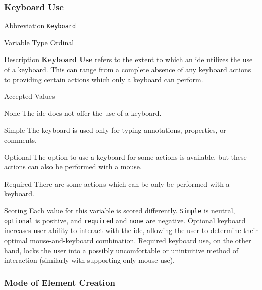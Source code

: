 \subsubsection{Keyboard Use}
\label{subsubsec:keyboard}

\begin{AlignedDesc}
  \item[Abbreviation] \texttt{Keyboard}

  \item[Variable Type] Ordinal

  \item[Description] \textbf{Keyboard Use} refers to the extent to which an
  \ac{ide} utilizes the use of a keyboard. This can range from a complete
  absence of any keyboard actions to providing certain actions which only a
  keyboard can perform.

  \item[Accepted Values]

  \begin{AlignedDesc}
    \item[None] The \ac{ide} does not offer the use of a keyboard.
    \item[Simple] The keyboard is used only for typing annotations,
      properties, or comments.
    \item[Optional] The option to use a keyboard for some actions is
    available, but these actions can also be performed with a mouse.
    \item[Required] There are some actions which can be only be performed
    with a keyboard.
  \end{AlignedDesc}

  \item[Scoring] Each value for this variable is scored differently.
  \texttt{Simple} is neutral, \texttt{optional} is positive, and
  \texttt{required} and \texttt{none} are negative. Optional keyboard
  increases user ability to interact with the \ac{ide}, allowing the user
  to determine their optimal mouse-and-keyboard combination. Required
  keyboard use, on the other hand, locks the user into a possibly
  uncomfortable or unintuitive method of interaction (similarly with
  supporting only mouse use).

\end{AlignedDesc}

\subsubsection{Mode of Element Creation}
\label{subsubsec:mode}

